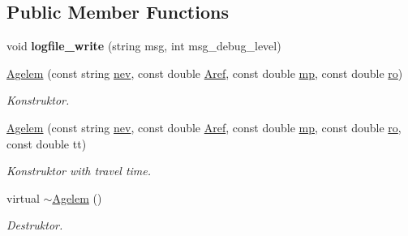 \subsection*{Public Member Functions}
\begin{DoxyCompactItemize}
\item 
\mbox{\label{class_agelem_a9dd12f555cf1927a743f2672a1545c61}} 
void {\bfseries logfile\+\_\+write} (string msg, int msg\+\_\+debug\+\_\+level)
\item 
\mbox{\label{class_agelem_a72fb0a2a58cfbcbcce00aa09ba40d8a0}} 
\hyperlink{class_agelem_a72fb0a2a58cfbcbcce00aa09ba40d8a0}{Agelem} (const string \hyperlink{class_agelem_abe92b7e3912367d5d1caf6b277ca0b7d}{nev}, const double \hyperlink{class_agelem_a3f8668febc2958fd539997d537552f17}{Aref}, const double \hyperlink{class_agelem_a1377d80d8511cc4adacccba31d28282d}{mp}, const double \hyperlink{class_agelem_a520072191e53f368a04ca80b8b583a3f}{ro})
\begin{DoxyCompactList}\small\item\em Konstruktor. \end{DoxyCompactList}\item 
\mbox{\label{class_agelem_ad8c13af2ccc41f2b68a693518c1e850e}} 
\hyperlink{class_agelem_ad8c13af2ccc41f2b68a693518c1e850e}{Agelem} (const string \hyperlink{class_agelem_abe92b7e3912367d5d1caf6b277ca0b7d}{nev}, const double \hyperlink{class_agelem_a3f8668febc2958fd539997d537552f17}{Aref}, const double \hyperlink{class_agelem_a1377d80d8511cc4adacccba31d28282d}{mp}, const double \hyperlink{class_agelem_a520072191e53f368a04ca80b8b583a3f}{ro}, const double tt)
\begin{DoxyCompactList}\small\item\em Konstruktor with travel time. \end{DoxyCompactList}\item 
\mbox{\label{class_agelem_a62ea4415f524e75918a2dde15e8bd560}} 
virtual \hyperlink{class_agelem_a62ea4415f524e75918a2dde15e8bd560}{$\sim$\+Agelem} ()
\begin{DoxyCompactList}\small\item\em Destruktor. \end{DoxyCompactList}\item 
\mbox{\label{class_agelem_aa440ca95f0c0d27092f048f0c95cd998}} 

\end{DoxyCompactItemize}
